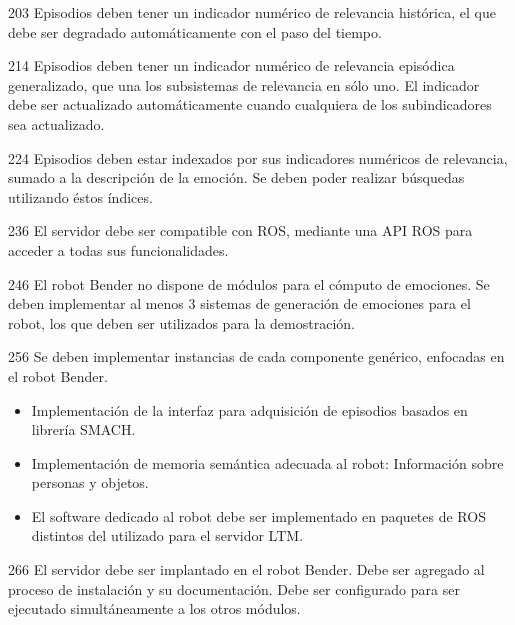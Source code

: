 \begin{requisito-sistema}{20}{3}
	Episodios deben tener un indicador numérico de relevancia histórica, el que debe ser degradado automáticamente con el paso del tiempo.	
\end{requisito-sistema}

\begin{requisito-sistema}{21}{4}
	Episodios deben tener un indicador numérico de relevancia episódica generalizado, que una los subsistemas de relevancia en sólo uno. El indicador debe ser actualizado automáticamente cuando cualquiera de los subindicadores sea actualizado.
\end{requisito-sistema}

\begin{requisito-sistema}{22}{4}
	Episodios deben estar indexados por sus indicadores numéricos de relevancia, sumado a la descripción de la emoción. Se deben poder realizar búsquedas utilizando éstos índices.
\end{requisito-sistema}

\begin{requisito-sistema}{23}{6}
	El servidor debe ser compatible con ROS, mediante una API ROS para acceder a todas sus funcionalidades.	
\end{requisito-sistema}

\begin{requisito-sistema}{24}{6}
	El robot Bender no dispone de módulos para el cómputo de emociones. Se deben implementar al menos 3 sistemas de generación de emociones para el robot, los que deben ser utilizados para la demostración.	
\end{requisito-sistema}

\begin{requisito-sistema}{25}{6}
	Se deben implementar instancias de cada componente genérico, enfocadas en el robot Bender.
	\begin{itemize}
		\item Implementación de la interfaz para adquisición de episodios basados en librería SMACH.
		\item Implementación de memoria semántica adecuada al robot: Información sobre personas y objetos.
		\item El software dedicado al robot debe ser implementado en paquetes de ROS distintos del utilizado para el servidor LTM.
	\end{itemize}	
\end{requisito-sistema}

\begin{requisito-sistema}{26}{6}
	El servidor debe ser implantado en el robot Bender. Debe ser agregado al proceso de instalación y su documentación. Debe ser configurado para ser ejecutado simultáneamente a los otros módulos.
\end{requisito-sistema}

